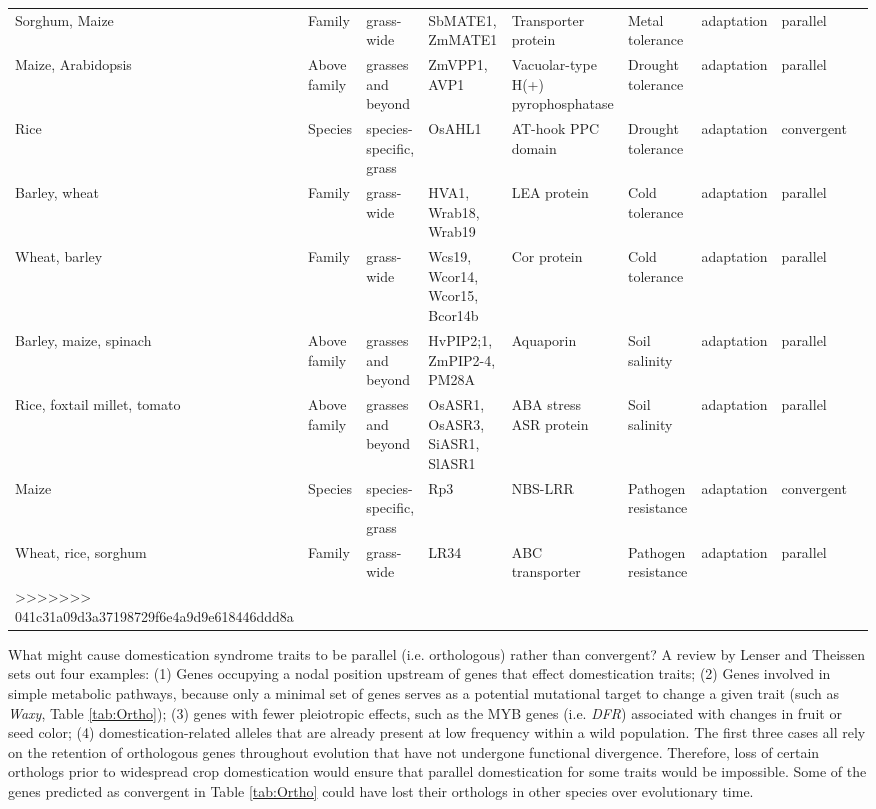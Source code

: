 \documentclass[12pt]{article}
\begin{document}
\begin{table}
\begin{center}
\begin{tabular}{G{3.5cm}G{2.5cm}C{3.10cm}C{3.5cm}C{1.95cm}G{2.0cm}G{1.8cm}G{1.5cm}G{1.5cm}}
Sorghum, Maize & Family & grass-wide & SbMATE1, ZmMATE1 & Transporter protein & Metal tolerance & adaptation & parallel & \citep{Martin2013}\\
Maize, Arabidopsis & Above family & grasses and beyond & ZmVPP1, AVP1 & Vacuolar-type H(+) pyrophosphatase & Drought tolerance & adaptation & parallel & \citep{Wang2016}\\
Rice & Species & species-specific, grass & OsAHL1 & AT-hook PPC domain & Drought tolerance & adaptation & convergent & \citep{Zhou2016}\\
Barley, wheat & Family & grass-wide & HVA1, Wrab18, Wrab19 & LEA protein & Cold tolerance & adaptation & parallel & \citep{Hong1988, pmid16755132}\\
Wheat, barley & Family & grass-wide & Wcs19, Wcor14, Wcor15, Bcor14b & Cor protein & Cold tolerance & adaptation & parallel & \citep{Takumi2003}\\
Barley, maize, spinach & Above family & grasses and beyond & HvPIP2;1, ZmPIP2-4, PM28A & Aquaporin & Soil salinity & adaptation & parallel & \citep{Katsuhara2002, Zhu2005, Fotiadis2000}\\
Rice, foxtail millet, tomato & Above family & grasses and beyond & OsASR1, OsASR3, SiASR1, SlASR1 & ABA stress ASR protein & Soil salinity & adaptation & parallel & \citep{Li2017, Konrad2008}\\
Maize & Species & species-specific, grass & Rp3 & NBS-LRR & Pathogen resistance & adaptation & convergent & \citep{pmid12242248}\\
Wheat, rice, sorghum & Family & grass-wide & LR34 & ABC transporter & Pathogen resistance & adaptation & parallel & \citep{Krattinger2010}\\
>>>>>>> 041c31a09d3a37198729f6e4a9d9e618446ddd8a
\end{tabular}
\end{center}
\end{table}

What might cause domestication syndrome traits to be parallel (i.e. orthologous) rather than convergent?
A review by Lenser and Theissen \citep{Lenser2013} sets out four examples: (1) Genes occupying a nodal position upstream of genes that effect domestication traits; (2) Genes involved in simple metabolic pathways, because only a minimal set of genes serves as a potential mutational target to change a given trait (such as \textit{Waxy}, Table \ref{tab:Ortho}); (3) genes with fewer pleiotropic effects, such as the MYB genes (i.e. \textit{DFR}) associated with changes in fruit or seed color; (4) domestication-related alleles that are already present at low frequency within a wild population. 
The first three cases all rely on the retention of orthologous genes throughout evolution that have not undergone functional divergence.
Therefore, loss of certain orthologs prior to widespread crop domestication would ensure that parallel domestication for some traits would be impossible.
Some of the genes predicted as convergent in Table \ref{tab:Ortho} could have lost their orthologs in other species over evolutionary time.
\end{document}
